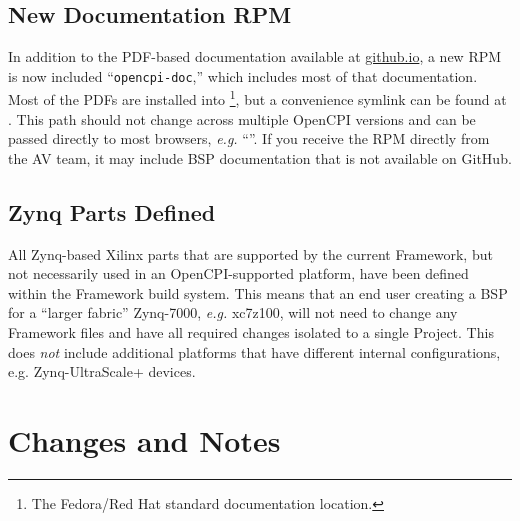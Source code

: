 \subsection{New Documentation RPM} %
\label{sec:14_docrpm}
In addition to the PDF-based documentation available at \href{http://opencpi.github.io/}{github.io}, a new RPM is now included ``\verb+opencpi-doc+,'' which includes most of that documentation. Most of the PDFs are installed into \footnote{The Fedora/Red Hat standard documentation location.}, but a convenience symlink can be found at . This path should not change across multiple OpenCPI versions and can be passed directly to most browsers, \textit{e.g.} ``''. If you receive the RPM directly from the AV team, it may include BSP documentation that is not available on GitHub.

\subsection{Zynq Parts Defined} %
\label{sec:14_zynq}
All Zynq-based Xilinx parts that are supported by the current Framework, but not necessarily used in an OpenCPI-supported platform, have been defined within the Framework build system. This means that an end user creating a BSP for a ``larger fabric'' Zynq-7000, \textit{e.g.} xc7z100, will not need to change any Framework files and have all required changes isolated to a single Project. This does \textit{not} include additional platforms that have different internal configurations, e.g. Zynq-UltraScale+ devices.

\section{Changes and Notes}
